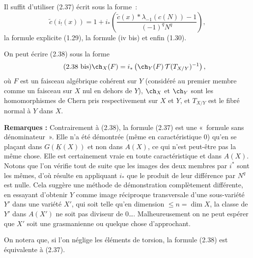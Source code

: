 Il
suffit d'utiliser (2.37) écrit sous la forme~:
\begin{equation}\tag{2.37 bis}
 \widetilde c(i_!(x))=1+i_*\left(\frac{\widetilde c(x)*\lambda_{-1}(c(N))-1}{(-1)^qN^q}\right),
\end{equation}
la formule explicite (1.29), la formule (iv bis) et enfin (1.30).

On peut écrire (2.38) sous la forme
\begin{equation}\tag{2.38 bis}
 \ch_X(F)=i_*\left(\ch_Y(F)\,\mathcal T(T_{X/Y})^{-1}\right),
\end{equation}
où $F$ est un faisceau algébrique cohérent sur $Y$ (considéré au premier membre comme un faisceau sur $X$ nul en dehors de $Y$), $\ch_X$ et $\ch_Y$ sont les homomorphismes de Chern pris respectivement sur $X$ et $Y$, et $T_{X/Y}$ est le fibré normal à $Y$ dans $X$.

\textbf{Remarques :} Contrairement à (2.38), la formule (2.37) est une «~formule sans dénominateur~». Elle n'a été démontrée (même en caractéristique $0$) qu'en se plaçant dans $G(\underline K(X))$ et non dans $A(X)$, ce qui n'est peut-être pas la même chose. Elle est certainement vraie en toute caractéristique et dans $A(X)$. Notons que l'on vérifie tout de suite que les images des deux membres par $i^*$ sont les mêmes, d'où résulte en appliquant $i_*$ que le produit de leur différence par $N^q$ est nulle. Cela suggère une méthode de démonstration complètement différente, en essayant d'obtenir $Y$ comme image réciproque transversale d'une sous-variété $Y'$ dans une variété $X'$, qui soit telle qu'en dimension $\leq n=\dim X$, la classe de $Y'$ dans $A(X')$ ne soit pas diviseur de $0$\dots. Malheureusement on ne peut espérer que $X'$ soit une grasmanienne ou quelque chose d'approchant.

On notera que, si l'on néglige les éléments de torsion, la formule (2.38) est équivalente à (2.37).




\providecommand{\cS}{\mathcal S}
\providecommand{\cD}{\mathcal D}
\providecommand{\cE}{\mathscr E}
\providecommand{\cG}{\mathscr G}
\providecommand{\cL}{\mathscr L}
\providecommand{\cM}{\mathscr M}
\providecommand{\cP}{\mathscr P}
\providecommand{\cK}{\mathcal K}
\providecommand{\Db}{\mathrm D}
\providecommand{\Kb}{\mathrm K}
\providecommand{\Trc}{\operatorname{Tr}}
\providecommand{\ob}{\operatorname{ob}}
\providecommand{\Coh}{\operatorname{Coh}}
\providecommand{\Cone}{\operatorname{Cone}}
\providecommand{\im}{\operatorname{Im}}
\providecommand{\Id}{\operatorname{Id}}
\providecommand{\RR}{\mathrm{R.R.}}
\providecommand{\RRR}{\mathrm{R.R.R.}}
\providecommand{\GrR}{\mathrm{G}}
\providecommand{\pr}{\operatorname{pr}}


